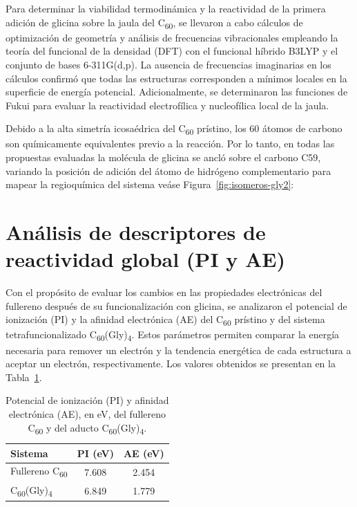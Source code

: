         
Para determinar la viabilidad termodinámica y la reactividad de la primera adición de glicina sobre la jaula del C\textsubscript{60}, se llevaron a cabo cálculos de optimización de geometría y análisis de frecuencias vibracionales empleando la teoría del funcional de la densidad (DFT) con el funcional híbrido B3LYP y el conjunto de bases 6-311G(d,p). La ausencia de frecuencias imaginarias en los cálculos confirmó que todas las estructuras corresponden a mínimos locales en la superficie de energía potencial. Adicionalmente, se determinaron las funciones de Fukui para evaluar la reactividad electrofílica y nucleofílica local de la jaula.

Debido a la alta simetría icosaédrica del C\textsubscript{60} prístino, los 60 átomos de carbono son químicamente equivalentes previo a la reacción. Por lo tanto, en todas las propuestas evaluadas la molécula de glicina se ancló sobre el carbono C59, variando la posición de adición del átomo de hidrógeno complementario para mapear la regioquímica del sistema veáse Figura~\ref{fig:isomeros-gly2}:


\section{Análisis de descriptores de reactividad global (PI y AE)}

Con el propósito de evaluar los cambios en las propiedades electrónicas del fullereno después de su funcionalización con glicina, se analizaron el potencial de ionización (PI) y la afinidad electrónica (AE) del C\textsubscript{60} prístino y del sistema tetrafuncionalizado C\textsubscript{60}(Gly)\textsubscript{4}. Estos parámetros permiten comparar la energía necesaria para remover un electrón y la tendencia energética de cada estructura a aceptar un electrón, respectivamente. Los valores obtenidos se presentan en la Tabla~\ref{tab:energias-referencia}.

\begin{table}[H]
    \centering
    \caption{Potencial de ionización (PI) y afinidad electrónica (AE), en eV, del fullereno C\textsubscript{60} y del aducto C\textsubscript{60}(Gly)\textsubscript{4}.}
    \label{tab:energias-referencia}
    \renewcommand{\arraystretch}{1.15}
    \begin{tabular}{lcc}
        \toprule
        \textbf{Sistema} & \textbf{PI (eV)} & \textbf{AE (eV)} \\
        \midrule
        Fullereno C\textsubscript{60} & 7.608 & 2.454 \\
        C\textsubscript{60}(Gly)\textsubscript{4} & 6.849 & 1.779 \\
        \bottomrule
    \end{tabular}
\end{table}

